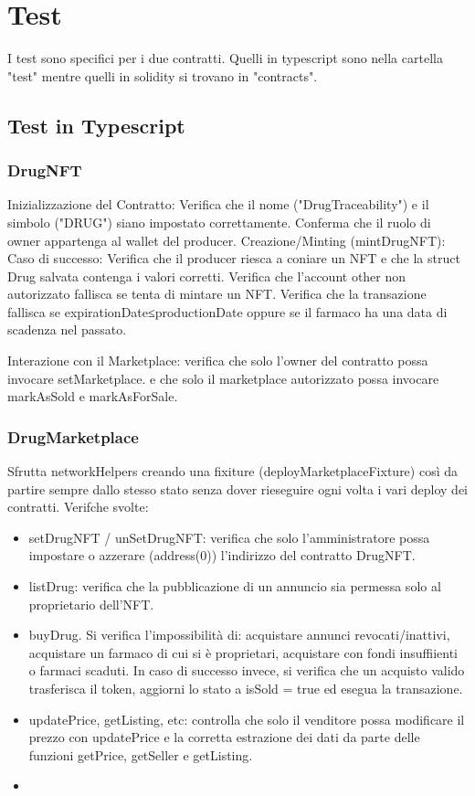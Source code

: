 \documentclass[12pt,a4paper]{article}
\begin{document}
\section{Test }
I test sono specifici per i due contratti. Quelli in typescript sono nella cartella "test" mentre quelli in solidity si trovano in "contracts".
\subsection{Test in Typescript}
\subsubsection[short]{DrugNFT}
Inizializzazione del Contratto: Verifica che il nome ("DrugTraceability") e il simbolo ("DRUG") siano impostato correttamente.
Conferma che il ruolo di owner appartenga al wallet del producer.
Creazione/Minting (mintDrugNFT):
Caso di successo: Verifica che il producer riesca a coniare un NFT e che la struct Drug salvata contenga i valori corretti.
Verifica che l'account other non autorizzato fallisca se tenta di mintare un NFT.
Verifica che la transazione fallisca se expirationDate≤productionDate oppure se il farmaco ha una data di scadenza nel passato.

Interazione con il Marketplace:
verifica che solo l'owner del contratto possa invocare setMarketplace.
e che solo il marketplace autorizzato possa invocare markAsSold e markAsForSale.
\subsubsection[short]{DrugMarketplace}
Sfrutta networkHelpers creando una fixiture (deployMarketplaceFixture) così da partire sempre dallo stesso stato senza dover rieseguire ogni volta i vari deploy dei contratti.
Verifche svolte: 
\begin{itemize}
    \item setDrugNFT / unSetDrugNFT: verifica che solo l'amministratore possa impostare o azzerare (address(0)) l'indirizzo del contratto DrugNFT.
    \item listDrug: verifica che la pubblicazione di un annuncio sia permessa solo al proprietario dell'NFT.
    \item buyDrug. Si verifica l'impossibilità di: acquistare annunci revocati/inattivi, acquistare un farmaco di cui si è proprietari, acquistare con fondi insuffiienti o farmaci scaduti. In caso di successo invece, si verifica che un acquisto valido trasferisca il token, aggiorni lo stato a isSold = true ed esegua la transazione.
    \item updatePrice, getListing, etc: controlla che solo il venditore possa modificare il prezzo con updatePrice e 
 la corretta estrazione dei dati da parte delle funzioni getPrice, getSeller e getListing.
    \item 
\end{itemize}
\end{document}
